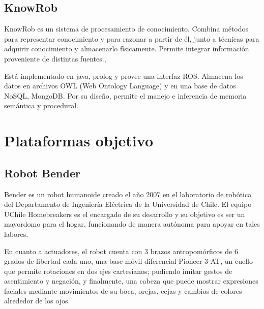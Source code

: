 \subsection{KnowRob}

KnowRob es un sistema de procesamiento de conocimiento. Combina m\'etodos para representar conocimiento y para razonar a partir de \'el, junto a t\'ecnicas  para adquirir conocimiento y almacenarlo f\'isicamente. Permite integrar informaci\'on proveniente de distintas fuentes.\cite{Tenorth2013}, \cite{Tenorth2009}

Est\'a implementado en java, prolog y provee una interfaz ROS. Almacena los datos en archivos OWL (Web Ontology Language) y en una base de datos NoSQL, MongoDB. Por su dise\~no, permite el manejo e inferencia de memoria sem\'antica y procedural.








\section{Plataformas objetivo}

\subsection{Robot Bender}

Bender es un robot humanoide creado el a\~no 2007 en el laboratorio de rob\'otica del Departamento de Ingenier\'ia El\'ectrica de la Universidad de Chile. El equipo UChile Homebreakers es el encargado de su desarrollo y  su objetivo es ser un mayordomo para el hogar, funcionando de manera aut\'onoma para apoyar en tales labores\cite{uchile-robotics}.


En cuanto a actuadores, el robot cuenta con 3 brazos antropom\'orficos de 6 grados de libertad cada uno, una base m\'ovil diferencial Pioneer 3-AT, un cuello que permite rotaciones en dos ejes cartesianos; pudiendo imitar gestos de asentimiento y negaci\'on, y finalmente, una cabeza que puede mostrar expresiones faciales mediante movimientos de su boca, orejas, cejas y cambios de colores alrededor de los ojos.

